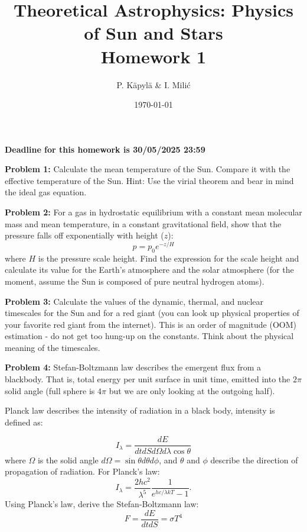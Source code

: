 \documentclass[12pt]{article}
\title{Theoretical Astrophysics: Physics of Sun and Stars\\
Homework 1}
\author{P. K\"{a}pyl\"{a} \& I. Mili\'{c}}
\date{\today}
\begin{document}
\maketitle

\textbf{Deadline for this homework is 30/05/2025 23:59}


{\bf Problem 1:} Calculate the mean temperature of the Sun. Compare it
with the effective temperature of the Sun. Hint: Use the virial
theorem and bear in mind the ideal gas equation.

{\bf Problem 2:} For a gas in hydrostatic equilibrium with a constant
mean molecular mass and mean temperature, in a constant gravitational
field, show that the pressure falls off exponentially with height
($z$):
\begin{equation}
p = p_0 e^{-z/H}
\end{equation}
where $H$ is the pressure scale height. Find the expression for the
scale height and calculate its value for the Earth's atmosphere and
the solar atmosphere (for the moment, assume the Sun is composed of
pure neutral hydrogen atoms).

{\bf Problem 3:} Calculate the values of the dynamic, thermal, and
nuclear timescales for the Sun and for a red giant (you can look up
physical properties of your favorite red giant from the
internet). This is an order of magnitude (OOM) estimation - do not get
too hung-up on the constants. Think about the physical meaning of the
timescales.

{\bf Problem 4:} Stefan-Boltzmann law describes the emergent flux from
a blackbody. That is, total energy per unit surface in unit time,
emitted into the $2\pi$ solid angle (full sphere is $4\pi$ but we are
only looking at the outgoing half).

Planck law describes the intensity of radiation in a black body,
intensity is defined as:

\begin{equation}
I_\lambda = \frac{dE}{dt dS d\Omega d\lambda \cos \theta}
\end{equation}
where $\Omega$ is the solid angle $d\Omega = \sin \theta d\theta
d\phi$, and $\theta$ and $\phi$ describe the direction of propagation
of radiation. For Planck's law:
\begin{equation}
I_\lambda = \frac{2hc^2}{\lambda^5} \frac{1}{e^{hc/\lambda k T} - 1}.
\end{equation}
Using Planck's law, derive the Stefan-Boltzmann law:
\begin{equation}
F = \frac{dE}{dt dS} = \sigma T^4
\end{equation}
\end{document}
